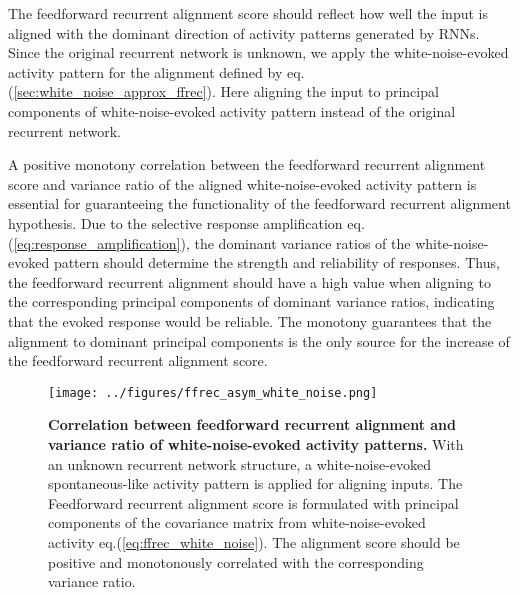 \documentclass[11pt]{article}
\begin{document}
	The feedforward recurrent alignment score should reflect how well the input is aligned with the dominant direction of activity patterns generated by RNNs. Since the original recurrent network is unknown, we apply the white-noise-evoked activity pattern  for the alignment defined by eq.(\ref{sec:white_noise_approx_ffrec}). Here aligning the input to principal components of white-noise-evoked activity pattern instead of the original recurrent network. 
	
	A positive monotony correlation between the feedforward recurrent alignment score and variance ratio of the aligned white-noise-evoked activity pattern is essential for guaranteeing the functionality of the feedforward recurrent alignment hypothesis. %
	Due to the selective response amplification eq.(\ref{eq:response_amplification}), the dominant variance ratios of the white-noise-evoked pattern should determine the strength and reliability of responses. Thus, the feedforward recurrent alignment should have a high value when aligning to the corresponding principal components of dominant variance ratios, indicating that the evoked response would be reliable. The monotony guarantees that the alignment to dominant principal components is the only source for the increase of the feedforward recurrent alignment score. 
	

		\begin{SCfigure}[0.9][h] 
			\centering
			\caption[Correlation between feedforward recurrent alignment and variance ratio of white-noise-evoked activity patterns]{\textbf{Correlation between feedforward recurrent alignment and variance ratio of white-noise-evoked activity patterns.} With an unknown recurrent network structure, a white-noise-evoked spontaneous-like activity pattern is applied for aligning inputs. The Feedforward recurrent alignment score is formulated with principal components of the covariance matrix from white-noise-evoked activity eq.(\ref{eq:ffrec_white_noise}). The alignment score should be positive and monotonously correlated with the corresponding variance ratio.}
			\texttt{[image: ../figures/ffrec\_asym\_white\_noise.png]}
			\label{fig:ffrec_variance_ratio_white_noise}
		\end{SCfigure}
\end{document}
